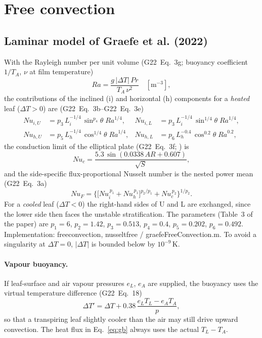 \documentclass[11pt,a4paper]{article}
\newcommand{\Nu}{\mathit{Nu}}
\newcommand{\NuF}{\mathit{Nu}_F}
\newcommand{\Ra}{\mathit{Ra}}
\newcommand{\Prn}{\mathit{Pr}}
\newcommand{\codeus}{\char95\allowbreak}
\DeclareRobustCommand{\code}[1]{\textnormal{\ttfamily\let\_\codeus #1}}
\newcommand{\Gtt}[1]{G22~Eq.~#1}
\begin{document}
\section{Free convection}\label{sec:free}
\subsection{Laminar model of Graefe et al. (2022)}
With the Rayleigh number per unit volume (\Gtt{3g}; buoyancy coefficient $1/T_A$, $\nu$ at film temperature)
\begin{equation}
\Ra = \frac{g\,|\Delta T|\,\Prn}{T_A\,\nu^2}\quad[\mathrm m^{-3}],
\end{equation}
the contributions of the inclined (i) and horizontal (h) components for a \emph{heated} leaf ($\Delta T>0$) are (\Gtt{3b}--\Gtt{3e})
\begin{align}
\Nu_{i,U} &= p_3\,L_i^{-1/4}\,\sin^{p_4}\theta\;\Ra^{1/4}, &
\Nu_{i,L} &= p_3\,L_i^{-1/4}\,\sin^{1/4}\theta\;\Ra^{1/4},\\
\Nu_{h,U} &= p_5\,L_h^{-1/4}\,\cos^{1/4}\theta\;\Ra^{1/4}, &
\Nu_{h,L} &= p_6\,L_h^{-0.4}\,\cos^{0.2}\theta\;\Ra^{0.2},
\end{align}
the conduction limit of the elliptical plate (\Gtt{3f}; \citealp{yovanovich1998}) is
\begin{equation}
\Nu_c = \frac{5.3\,\sin(0.0338\,AR + 0.607)}{\sqrt S},
\end{equation}
and the side-specific flux-proportional Nusselt number is the nested power mean (\Gtt{3a})
\begin{equation}
\NuF = \Big\{\big[\Nu_i^{\,p_1} + \Nu_h^{\,p_1}\big]^{p_2/p_1} + \Nu_c^{\,p_2}\Big\}^{1/p_2}.\label{eq:free}
\end{equation}
For a \emph{cooled} leaf ($\Delta T<0$) the right-hand sides of U and L are exchanged, since the lower side then faces the unstable stratification. The parameters (Table~3 of the paper) are $p_1 = 6$, $p_2 = 1.42$, $p_3 = 0.513$, $p_4 = 0.4$, $p_5 = 0.202$, $p_6 = 0.492$. Implementation: \code{free\_convection}, \code{nusselt\_free} / \code{graefeFreeConvection.m}. To avoid a singularity at $\Delta T=0$, $|\Delta T|$ is bounded below by \ensuremath{10^{-9}}\,K.

\paragraph{Vapour buoyancy.} If leaf-surface and air vapour pressures $e_L$, $e_A$ are supplied, the buoyancy uses the virtual temperature difference (\Gtt{18})
\begin{equation}
\Delta T' = \Delta T + 0.38\,\frac{e_L T_L - e_A T_A}{p},\label{eq:virtual}
\end{equation}
so that a transpiring leaf slightly cooler than the air may still drive upward convection. The heat flux in Eq.~\eqref{eq:gb} always uses the actual $T_L-T_A$.
\end{document}
